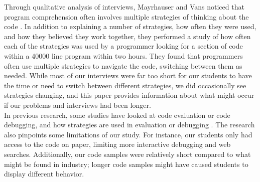 Through qualitative analysis of interviews, Mayrhauser and Vans noticed that program comprehension often involves multiple strategies of thinking about the code \cite{402076}.
In addition to explaining a number of strategies, how often they were used, and how they believed they work together, they performed a study of how often each of the strategies was used by a programmer looking for a section of code within a 40000 line program within two hours. They found that programmers often use multiple strategies to navigate the code, switching between them as needed.
While most of our interviews were far too short for our students to have the time or need to switch between different strategies, we did occasionally see strategies changing, and this paper provides information about what might occur if our problems and interviews had been longer. \\

In previous research, some studies have looked at code evaluation or code debugging, and how strategies are used in evaluation or debugging \citeyear{mosemann2001, fitzgerald2008, 1021348, 402076}.
The research also pinpoints some limitations of our study.
For instance, our students only had access to the code on paper, limiting more interactive debugging and web searches.
Additionally, our code samples were relatively short compared to what might be found in industry;
 longer code samples might have caused students to display different behavior.

\newpage

